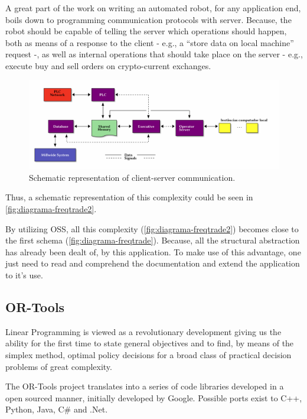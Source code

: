 \documentclass[
12pt,				%
openright,			%
oneside,			%
a4paper,			%
brazil,				%
english,			%
]{abntex2}
\begin{document}
A great part of the work on writing an automated robot, for any
application end, boils down to programming communication protocols
with server. Because, the robot should be capable of telling the
server which operations should happen, both as means of a response to
the client - e.g., a ``store data on local machine'' request -, as
well as internal operations that should take place on the server -
e.g., execute buy and sell orders on crypto-current exchanges.  

\begin{figure}[ht]
  \centering
    \caption{\label{fig:diagrama-freqtrade2} Schematic representation
      of client-server communication.}
  \includegraphics[width=1\linewidth]{ditaa_4.png}
\end{figure}

Thus, a schematic representation of this complexity could be seen in \autoref{fig:diagrama-freqtrade2}.

By utilizing OSS, all this complexity
(\autoref{fig:diagrama-freqtrade2}) becomes close to the first schema
(\autoref{fig:diagrama-freqtrade}). Because, all the structural
abstraction has already been dealt of, by this application. To make
use of this advantage, one just need to read and comprehend the
documentation and extend the application to it's use.

\clearpage
\subsection{OR-Tools}
\label{sec:ortools}

\begin{citacao}
Linear Programming is viewed as a revolutionary development giving us
the ability for the first time to state general objectives and to
find, by means of the simplex method, optimal policy decisions for a
broad class of practical decision problems of great complexity. \cite{dantzig1983}
\end{citacao}


The OR-Tools project translates into a series of code libraries
developed in a open sourced manner, initially developed by
Google. Possible ports exist to C++, Python, Java, C\# and .Net.  
\end{document}
